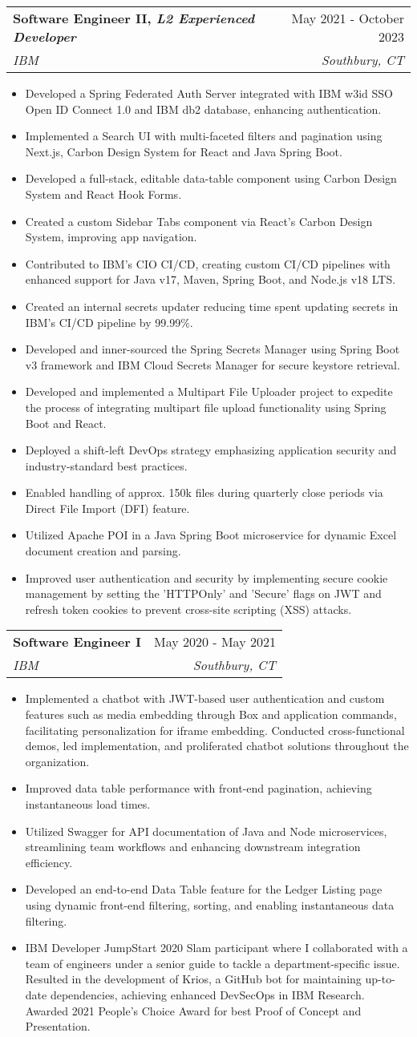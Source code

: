 \documentclass[letterpaper,11pt]{article}
\makeatletter
\newcommand{\resumeItem}[1]{
  \item[-] \small{
    {#1 \vspace{-2pt}}
  }
}
\newcommand{\resumeSubheading}[4]{
  \vspace{-2pt}\item
    \begin{tabular*}{0.97\textwidth}[t]{l@{\extracolsep{\fill}}r}
      \textbf{#1} & #2 \\
      \textit{\small#3} & \textit{\small #4} \\
    \end{tabular*}\vspace{-7pt}
}
\newcommand{\resumeItemListStart}{\begin{itemize}[rightmargin=\dimexpr\linewidth-17.25cm-\leftmargin\relax]}
\newcommand{\resumeItemListEnd}{\end{itemize}\vspace{-5pt}}
\makeatother
\begin{document}
\resumeSubheading
{Software Engineer II, \emph{L2 Experienced Developer}}{May 2021 - October 2023}
{IBM}{Southbury, CT}
\resumeItemListStart
\resumeItem{Developed a Spring Federated Auth Server integrated with IBM w3id SSO Open ID Connect 1.0 and IBM db2 database, enhancing authentication.}
\resumeItem{Implemented a Search UI with multi-faceted filters and pagination using Next.js, Carbon Design System for React and Java Spring Boot.}
\resumeItem{Developed a full-stack, editable data-table component using Carbon Design System and React Hook Forms.}
\resumeItem{Created a custom Sidebar Tabs component via React's Carbon Design System, improving app navigation.}
\resumeItem{Contributed to IBM's CIO CI/CD, creating custom CI/CD pipelines with enhanced support for Java v17, Maven, Spring Boot, and Node.js v18 LTS.}
\resumeItem{Created an internal secrets updater reducing time spent updating secrets in IBM's CI/CD pipeline by 99.99\%.}
\resumeItem{Developed and inner-sourced the Spring Secrets Manager using Spring Boot v3 framework and IBM Cloud Secrets Manager for secure keystore retrieval.}
\resumeItem{Developed and implemented a Multipart File Uploader project to expedite the process of integrating multipart file upload functionality using Spring Boot and React.}
\resumeItem{Deployed a shift-left DevOps strategy emphasizing application security and industry-standard best practices.}
\resumeItem{Enabled handling of approx. 150k files during quarterly close periods via Direct File Import (DFI) feature.}
\resumeItem{Utilized Apache POI in a Java Spring Boot microservice for dynamic Excel document creation and parsing.}
\resumeItem{Improved user authentication and security by implementing secure cookie management by setting the 'HTTPOnly' and 'Secure' flags on JWT and refresh token cookies to prevent cross-site scripting (XSS) attacks.}
\resumeItemListEnd

\resumeSubheading
{Software Engineer I}{May 2020 - May 2021}
{IBM}{Southbury, CT}
\resumeItemListStart
\resumeItem{Implemented a chatbot with JWT-based user authentication and custom features such as media embedding through Box and application commands, facilitating personalization for iframe embedding. Conducted cross-functional demos, led implementation, and proliferated chatbot solutions throughout the organization.}
\resumeItem{Improved data table performance with front-end pagination, achieving instantaneous load times.}
\resumeItem{Utilized Swagger for API documentation of Java and Node microservices, streamlining team workflows and enhancing downstream integration efficiency.}
\resumeItem{Developed an end-to-end Data Table feature for the Ledger Listing page using dynamic front-end filtering, sorting, and enabling instantaneous data filtering.}
\resumeItem{IBM Developer JumpStart 2020 Slam participant where I collaborated with a team of engineers under a senior guide to tackle a department-specific issue. Resulted in the development of Krios, a GitHub bot for maintaining up-to-date dependencies, achieving enhanced DevSecOps in IBM Research. Awarded 2021 People's Choice Award for best Proof of Concept and Presentation.}
\resumeItemListEnd
\end{document}
